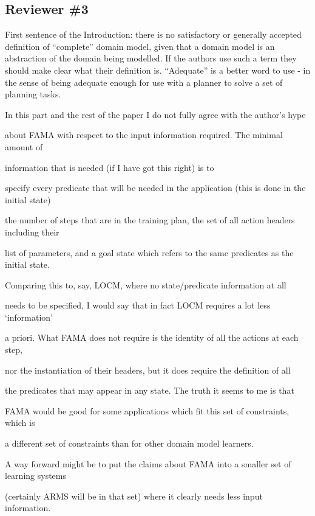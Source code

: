 \documentclass{article}
\begin{document}
\subsection*{Reviewer \#3}


\begin{mdframed}[hidealllines=true,backgroundcolor=gray!20]
First sentence of the Introduction: there is no satisfactory or generally accepted definition of “complete” domain model, given that a domain model is an abstraction of the domain being modelled. If the authors use such a term they should  make clear what their definition is. “Adequate” is a better word to use - in the sense of being adequate enough for use with a planner to solve a set of planning  tasks.
\end{mdframed}

\begin{mdframed}[hidealllines=true,backgroundcolor=gray!20]
  In this part and the rest of the paper I do not fully agree with the author’s hype 

about FAMA with respect to the input information required. The minimal amount of

information that is needed (if I have got this right) is to 

specify every predicate that will be needed in the application (this is done in the initial state)

the number of steps that are in the training plan, the set of all action headers including their 

list of parameters, and a goal state which refers to the same predicates as the initial state.

 Comparing this to, say, LOCM, where no state/predicate information at all

needs to be specified, I would say that in fact LOCM requires a lot less ‘information’ 

a priori. What FAMA does not require is the identity of all the actions at each step,

nor the instantiation of their headers, but it does require the definition of all

the predicates that may appear in any state. The truth it seems to me is that 

FAMA would be good for some applications which fit this set of constraints, which is

a different set of constraints than for other domain model learners.

A way forward might be to put the claims about FAMA into a smaller set of learning systems

(certainly ARMS will be in that set) where it clearly needs less input information.
\end{mdframed}
\end{document}
